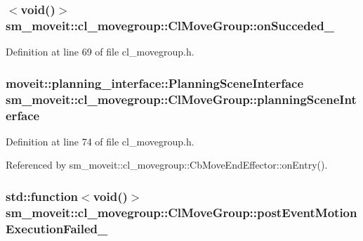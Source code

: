 \subsubsection[{\texorpdfstring{on\+Succeded\+\_\+}{onSucceded_}}]{$<$void()$>$ sm\+\_\+moveit\+::cl\+\_\+movegroup\+::\+Cl\+Move\+Group\+::on\+Succeded\+\_\+\hspace{0.3cm}{\ttfamily [private]}}\hypertarget{classsm__moveit_1_1cl__movegroup_1_1ClMoveGroup_ad0a02fb564967bae0808c966dd1e3c36}{}\label{classsm__moveit_1_1cl__movegroup_1_1ClMoveGroup_ad0a02fb564967bae0808c966dd1e3c36}


Definition at line 69 of file cl\+\_\+movegroup.\+h.

\subsubsection[{\texorpdfstring{planning\+Scene\+Interface}{planningSceneInterface}}]{\setlength{\rightskip}{0pt plus 5cm}moveit\+::planning\+\_\+interface\+::\+Planning\+Scene\+Interface sm\+\_\+moveit\+::cl\+\_\+movegroup\+::\+Cl\+Move\+Group\+::planning\+Scene\+Interface}\hypertarget{classsm__moveit_1_1cl__movegroup_1_1ClMoveGroup_a26b5c9e0aef1cd67ee977a756b69cf76}{}\label{classsm__moveit_1_1cl__movegroup_1_1ClMoveGroup_a26b5c9e0aef1cd67ee977a756b69cf76}


Definition at line 74 of file cl\+\_\+movegroup.\+h.



Referenced by sm\+\_\+moveit\+::cl\+\_\+movegroup\+::\+Cb\+Move\+End\+Effector\+::on\+Entry().

\subsubsection[{\texorpdfstring{post\+Event\+Motion\+Execution\+Failed\+\_\+}{postEventMotionExecutionFailed_}}]{\setlength{\rightskip}{0pt plus 5cm}std\+::function$<$void()$>$ sm\+\_\+moveit\+::cl\+\_\+movegroup\+::\+Cl\+Move\+Group\+::post\+Event\+Motion\+Execution\+Failed\+\_\+\hspace{0.3cm}{\ttfamily [private]}}\hypertarget{classsm__moveit_1_1cl__movegroup_1_1ClMoveGroup_a0d97eb41759179bdaa355bb378a60f33}{}\label{classsm__moveit_1_1cl__movegroup_1_1ClMoveGroup_a0d97eb41759179bdaa355bb378a60f33}


